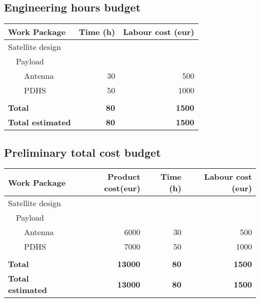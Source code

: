 \documentclass[12pt, titlepage]{article}
\begin{document}
\subsection{Engineering hours budget}
\begin{tabular}{ | l | r | r | }
\hline
Work Package & Time (h) & Labour cost (eur) \\ \hline
Satellite design &  &  \\ \hline
~~Payload &  &  \\ \hline
~~~~Antenna & 30 & 500 \\ \hline
~~~~PDHS & 50 & 1000 \\ \hline
 &  &  \\ \hline
\textbf{Total} & \textbf{80} & \textbf{1500} \\ \hline
\textbf{Total estimated} & \textbf{80} & \textbf{1500} \\
\hline
\end{tabular}
 

\subsection{Preliminary total cost budget} 
\begin{tabular}{ | l | r | r | r | }
\hline
Work Package & Product cost(eur) & Time (h) & Labour cost (eur) \\ \hline
Satellite design &  &  &  \\ \hline
~~Payload &  &  &  \\ \hline
~~~~Antenna & 6000 & 30 & 500 \\ \hline
~~~~PDHS & 7000  & 50 & 1000 \\ \hline
 &  &  &  \\ \hline
\textbf{Total} & \textbf{13000} & \textbf{80} & \textbf{1500} \\ \hline
\textbf{Total estimated} & \textbf{13000} & \textbf{80} & \textbf{1500} \\
\hline
\end{tabular}


\pagebreak


\end{document}
